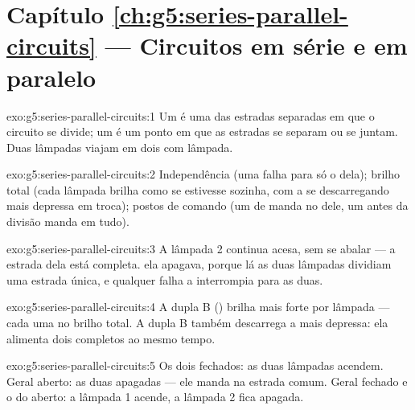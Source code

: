 \section*{Capítulo \ref{ch:g5:series-parallel-circuits} --- Circuitos em série e em paralelo}

\begin{solution}{exo:g5:series-parallel-circuits:1}
Um  é uma das estradas separadas em que o circuito se divide; um
 é um ponto em que as estradas se separam ou se juntam. Duas
lâmpadas  viajam em dois  com lâmpada.
\end{solution}

\begin{solution}{exo:g5:series-parallel-circuits:2}
Independência (uma falha para só o  dela); brilho total (cada
lâmpada brilha como se estivesse sozinha, com a  se
descarregando mais depressa em troca); postos de comando (um
 de  manda no  dele, um  antes da
divisão manda em tudo).
\end{solution}

\begin{solution}{exo:g5:series-parallel-circuits:3}
A lâmpada 2 continua acesa, sem se abalar --- a estrada dela está
completa.  ela apagava, porque lá as duas lâmpadas dividiam
uma estrada única, e qualquer falha a interrompia para as duas.
\end{solution}

\begin{solution}{exo:g5:series-parallel-circuits:4}
A dupla B () brilha mais forte por lâmpada --- cada uma no
brilho total. A dupla B também descarrega a  mais depressa: ela
alimenta dois  completos ao mesmo tempo.
\end{solution}

\begin{solution}{exo:g5:series-parallel-circuits:5}
Os dois fechados: as duas lâmpadas acendem. Geral aberto: as duas
apagadas --- ele manda na estrada comum. Geral fechado e o do 
aberto: a lâmpada 1 acende, a lâmpada 2 fica apagada.
\end{solution}

